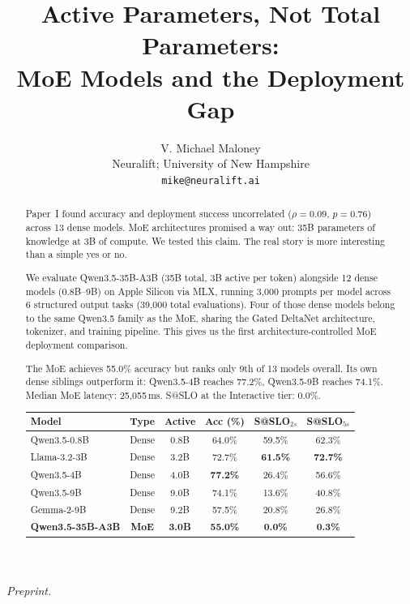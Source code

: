 \documentclass[11pt]{article}
\title{Active Parameters, Not Total Parameters:\\MoE Models and the Deployment Gap}
\author{
V. Michael Maloney \\
Neuralift; University of New Hampshire \\
\texttt{mike@neuralift.ai}
}
\date{}
\begin{document}
\maketitle
\begin{center}
\textit{Preprint.}
\end{center}

\begin{abstract}
Paper~I found accuracy and deployment success uncorrelated ($\rho = 0.09$, $p = 0.76$) across 13 dense models.  MoE architectures promised a way out: 35B parameters of knowledge at 3B of compute.  We tested this claim.  The real story is more interesting than a simple yes or no.

We evaluate Qwen3.5-35B-A3B (35B total, 3B active per token) alongside 12 dense models (0.8B--9B) on Apple Silicon via MLX, running 3,000 prompts per model across 6 structured output tasks (39,000 total evaluations).  Four of those dense models belong to the same Qwen3.5 family as the MoE, sharing the Gated DeltaNet architecture, tokenizer, and training pipeline.  This gives us the first architecture-controlled MoE deployment comparison.

The MoE achieves 55.0\% accuracy but ranks only 9th of 13 models overall.  Its own dense siblings outperform it: Qwen3.5-4B reaches 77.2\%, Qwen3.5-9B reaches 74.1\%.  Median MoE latency: 25,055\,ms.  S@SLO at the Interactive tier: 0.0\%.

\begin{center}
\small
\begin{tabular}{lcc ccc}
\toprule
\textbf{Model} & \textbf{Type} & \textbf{Active} & \textbf{Acc (\%)} & \textbf{S@SLO$_{2s}$} & \textbf{S@SLO$_{5s}$} \\
\midrule
\textcolor{matchedorange}{Qwen3.5-0.8B} & \textcolor{matchedorange}{Dense} & \textcolor{matchedorange}{0.8B} & \textcolor{matchedorange}{64.0\%} & \textcolor{matchedorange}{59.5\%} & \textcolor{matchedorange}{62.3\%} \\
Llama-3.2-3B     & Dense & 3.2B  & 72.7\% & \textbf{61.5\%} & \textbf{72.7\%} \\
Qwen3.5-4B       & Dense & 4.0B  & \textbf{77.2\%} & 26.4\% & 56.6\% \\
Qwen3.5-9B       & Dense & 9.0B  & 74.1\% & 13.6\% & 40.8\% \\
Gemma-2-9B       & Dense & 9.2B  & 57.5\% & 20.8\% & 26.8\% \\
\midrule
\textcolor{moepurple}{\textbf{Qwen3.5-35B-A3B}} & \textcolor{moepurple}{\textbf{MoE}} & \textcolor{moepurple}{\textbf{3.0B}} & \textcolor{moepurple}{\textbf{55.0\%}} & \textcolor{moepurple}{\textbf{0.0\%}} & \textcolor{moepurple}{\textbf{0.3\%}} \\
\bottomrule
\end{tabular}
\end{center}


\end{abstract}
\end{document}
